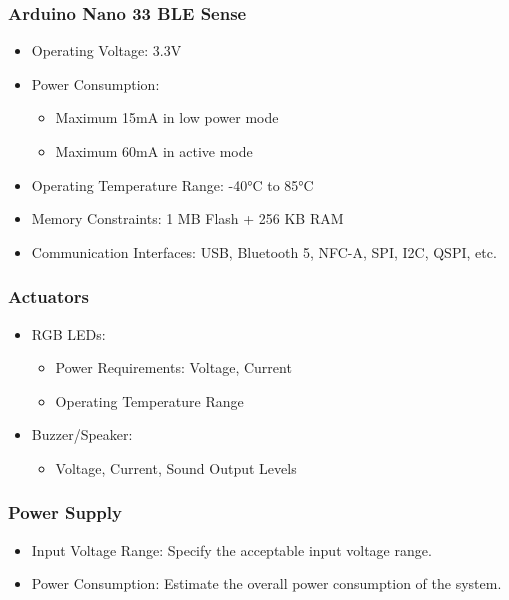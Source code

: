 \subsubsection{Arduino Nano 33 BLE Sense}
\begin{itemize}[label=--]
	\item Operating Voltage: 3.3V
	\item Power Consumption:
	\begin{itemize}[label=--,leftmargin=*]
		\item Maximum 15mA in low power mode
		\item Maximum 60mA in active mode
	\end{itemize}
	\item Operating Temperature Range: -40°C to 85°C
	\item Memory Constraints: 1 MB Flash + 256 KB RAM
	\item Communication Interfaces: USB, Bluetooth 5, NFC-A, SPI, I2C, QSPI, etc.
\end{itemize}


\subsubsection*{Actuators}
\begin{itemize}[label=--]
	\item RGB LEDs:
	\begin{itemize}[label=--,leftmargin=*]
		\item Power Requirements: Voltage, Current
		\item Operating Temperature Range
	\end{itemize}
	\item Buzzer/Speaker:
	\begin{itemize}[label=--,leftmargin=*]
		\item  Voltage, Current, Sound Output Levels
	\end{itemize}
	
\end{itemize}

\subsubsection*{Power Supply}
\begin{itemize}[label=--]
	\item Input Voltage Range: Specify the acceptable input voltage range.
	\item Power Consumption: Estimate the overall power consumption of the system.
\end{itemize}


